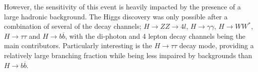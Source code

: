 However, the sensitivity of this event is heavily impacted by the presence of a large hadronic background. The Higgs discovery was only possible after a combination of several of the decay channels; $H\rightarrow ZZ \rightarrow 4l$, $H\rightarrow \gamma \gamma$, $H\rightarrow WW^*$, $H\rightarrow \tau\tau$ and $H\rightarrow b\overline{b}$, with the di-photon and 4 lepton decay channels being the main contributors. Particularly interesting is the $H\rightarrow \tau\tau$ decay mode, providing a relatively large branching fraction while being less impaired by backgrounds than $H\rightarrow b\overline{b}$.
